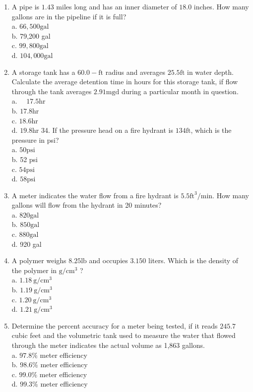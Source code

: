 \documentclass[10pt]{article}
\begin{document}
\begin{enumerate}
  \item A pipe is $1.43$ miles long and has an inner diameter of $18.0$ inches. How many gallons are in the pipeline if it is full?\\
a. $66,500 \mathrm{gal}$\\
b. 79,200 gal\\
c. $99,800 \mathrm{gal}$\\
d. $104,000 \mathrm{gal}$

  \item A storage tank has a $60.0-\mathrm{ft}$ radius and averages $25.5 \mathrm{ft}$ in water depth. Calculate the average detention time in hours for this storage tank, if flow through the tank averages $2.91 \mathrm{mgd}$ during a particular month in question.\\
a. $\quad 17.5 \mathrm{hr}$\\
b. $17.8 \mathrm{hr}$\\
c. $18.6 \mathrm{hr}$\\
d. $19.8 \mathrm{hr}$ 34. If the pressure head on a fire hydrant is $134 \mathrm{ft}$, which is the pressure in psi?\\
a. $50 \mathrm{psi}$\\
b. 52 psi\\
c. $54 \mathrm{psi}$\\
d. $58 \mathrm{psi}$

  \item A meter indicates the water flow from a fire hydrant is $5.5 \mathrm{ft}^{3} / \mathrm{min}$. How many gallons will flow from the hydrant in 20 minutes?\\
a. $820 \mathrm{gal}$\\
b. $850 \mathrm{gal}$\\
c. $880 \mathrm{gal}$\\
d. 920 gal

  \item A polymer weighs $8.25 \mathrm{lb}$ and occupies $3.150$ liters. Which is the density of the polymer in $\mathrm{g} / \mathrm{cm}^{3}$ ?\\
a. $1.18 \mathrm{~g} / \mathrm{cm}^{3}$\\
b. $1.19 \mathrm{~g} / \mathrm{cm}^{3}$\\
c. $1.20 \mathrm{~g} / \mathrm{cm}^{3}$\\
d. $1.21 \mathrm{~g} / \mathrm{cm}^{3}$

  \item Determine the percent accuracy for a meter being tested, if it reads $245.7$ cubic feet and the volumetric tank used to measure the water that flowed through the meter indicates the actual volume as 1,863 gallons.\\
a. $97.8 \%$ meter efficiency\\
b. $98.6 \%$ meter efficiency\\
c. $99.0 \%$ meter efficiency\\
d. $99.3 \%$ meter efficiency


\end{enumerate}
\end{document}
